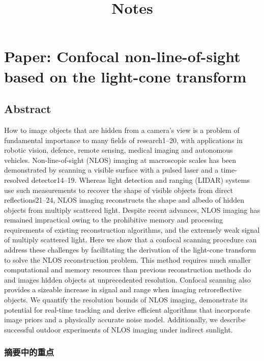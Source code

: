 \documentclass[11pt]{article}
\title{Notes}
\begin{document}
    
    
    \maketitle
    
    

    
    \section{Paper: Confocal non-line-of-sight based on the light-cone
transform}\label{paper-confocal-non-line-of-sight-based-on-the-light-cone-transform}

    \subsection{Abstract}\label{abstract}

How to image objects that are hidden from a camera's view is a problem
of fundamental importance to many fields of research1--20, with
applications in robotic vision, defence, remote sensing, medical imaging
and autonomous vehicles. Non-line-of-sight (NLOS) imaging at macroscopic
scales has been demonstrated by scanning a visible surface with a pulsed
laser and a time-resolved detector14--19. Whereas light detection and
ranging (LIDAR) systems use such measurements to recover the shape of
visible objects from direct reflections21--24, NLOS imaging reconstructs
the shape and albedo of hidden objects from multiply scattered light.
Despite recent advances, NLOS imaging has remained impractical owing to
the prohibitive memory and processing requirements of existing
reconstruction algorithms, and the extremely weak signal of multiply
scattered light. Here we show that a confocal scanning procedure can
address these challenges by facilitating the derivation of the
light-cone transform to solve the NLOS reconstruction problem. This
method requires much smaller computational and memory resources than
previous reconstruction methods do and images hidden objects at
unprecedented resolution. Confocal scanning also provides a sizeable
increase in signal and range when imaging retroreflective objects. We
quantify the resolution bounds of NLOS imaging, demonstrate its
potential for real-time tracking and derive efficient algorithms that
incorporate image priors and a physically accurate noise model.
Additionally, we describe successful outdoor experiments of NLOS imaging
under indirect sunlight.

    \subsubsection{摘要中的重点}\label{ux6458ux8981ux4e2dux7684ux91cdux70b9}
\end{document}
